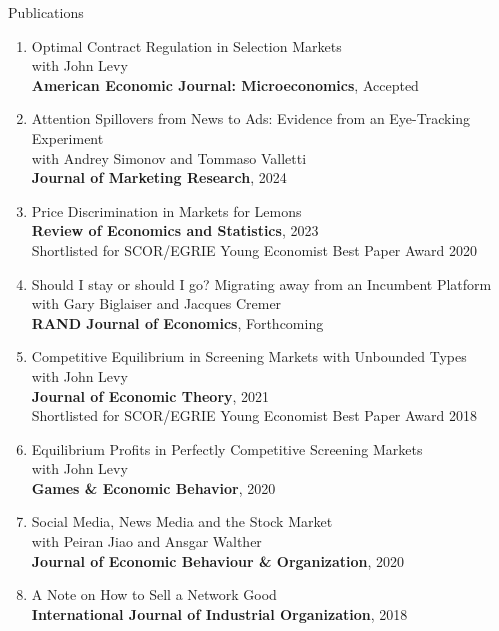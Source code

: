 \documentclass{resume}
\begin{document}
\begin{rSection}{Publications}

\begin{enumerate}

\item Optimal Contract Regulation in Selection Markets \\
with John Levy\\ \textbf{American Economic Journal: Microeconomics}, Accepted

\item Attention Spillovers from News to Ads: Evidence from an Eye-Tracking Experiment \\ 
with Andrey Simonov and Tommaso Valletti\\ \textbf{Journal of Marketing Research}, 2024

\item Price Discrimination in Markets for Lemons \\ 
\textbf{Review of Economics and Statistics}, 2023 \\
Shortlisted for SCOR/EGRIE Young Economist Best Paper Award 2020

\item Should I stay or should I go? Migrating away from an Incumbent Platform \\ 
with Gary Biglaiser and Jacques Cremer \\ 
\textbf{RAND Journal of Economics}, Forthcoming

\item Competitive Equilibrium in Screening Markets with Unbounded Types\\ 
with John Levy \\
\textbf{Journal of Economic Theory}, 2021
\\ Shortlisted for SCOR/EGRIE Young Economist Best Paper Award 2018

\item Equilibrium Profits in Perfectly Competitive Screening Markets\\
with John Levy \\
\textbf{Games \& Economic Behavior}, 2020

\item Social Media, News Media and the Stock Market\\ 
with Peiran Jiao and Ansgar Walther \\
\textbf{Journal of Economic Behaviour \& Organization}, 2020

\item A Note on How to Sell a Network Good \\
\textbf{International Journal of Industrial Organization}, 2018


\end{enumerate}
\end{rSection}
\end{document}
